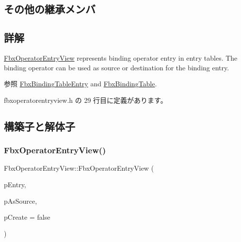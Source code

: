 \subsection*{その他の継承メンバ}


\subsection{詳解}
\hyperlink{class_fbx_operator_entry_view}{Fbx\+Operator\+Entry\+View} represents binding operator entry in entry tables. The binding operator can be used as source or destination for the binding entry. \begin{DoxySeeAlso}{参照}
\hyperlink{class_fbx_binding_table_entry}{Fbx\+Binding\+Table\+Entry} and \hyperlink{class_fbx_binding_table}{Fbx\+Binding\+Table}. 
\end{DoxySeeAlso}


 fbxoperatorentryview.\+h の 29 行目に定義があります。



\subsection{構築子と解体子}
\mbox{\label{class_fbx_operator_entry_view_aa76912191b34b80d88112072b6915182}} 
\subsubsection{\texorpdfstring{Fbx\+Operator\+Entry\+View()}{FbxOperatorEntryView()}}
{\footnotesize\ttfamily Fbx\+Operator\+Entry\+View\+::\+Fbx\+Operator\+Entry\+View (\begin{DoxyParamCaption}\item[{\hyperlink{class_fbx_binding_table_entry}{Fbx\+Binding\+Table\+Entry} $\ast$}]{p\+Entry,  }\item[{bool}]{p\+As\+Source,  }\item[{bool}]{p\+Create = {\ttfamily false} }\end{DoxyParamCaption})}

